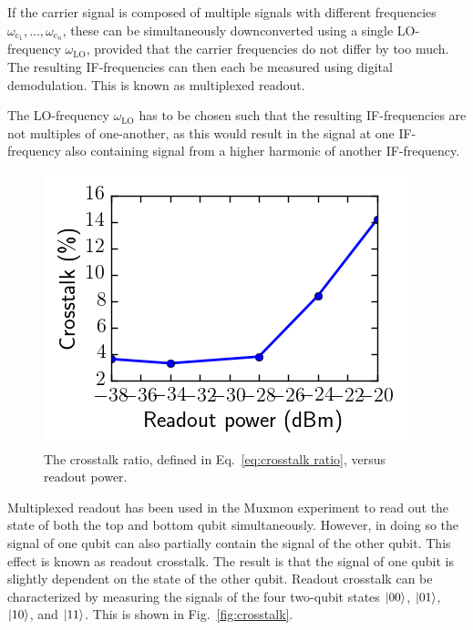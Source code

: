           If the carrier signal is composed of multiple signals with different frequencies $\omega_{\text{c}_1}, ..., \omega_{\text{c}_n}$, these can be simultaneously downconverted using a single LO-frequency $\omega_\text{LO}$, provided that the carrier frequencies do not differ by too much. The resulting IF-frequencies can then each be measured using digital demodulation. This is known as multiplexed readout.

          The LO-frequency $\omega_\text{LO}$ has to be chosen such that the resulting IF-frequencies are not multiples of one-another, as this would result in the signal at one IF-frequency also containing signal from a higher harmonic of another IF-frequency.

          \begin{figure}
            \begin{center}
            \vspace{-30pt}
              \includegraphics[width=\textwidth]{Figures/Calibration routines/crosstalk ratio.png}
            \end{center}
            \vspace{-20 pt}
            \caption{The crosstalk ratio, defined in Eq.~\ref{eq:crosstalk ratio}, versus readout power.}
            \label{fig:crosstalk ratio}
          \end{figure}

          Multiplexed readout has been used in the Muxmon experiment to read out the state of both the top and bottom qubit simultaneously. However, in doing so the signal of one qubit can also partially contain the signal of the other qubit. This effect is known as readout crosstalk. The result is that the signal of one qubit is slightly dependent on the state of the other qubit. Readout crosstalk can be characterized by measuring the signals of the four two-qubit states $\ket{00}$, $\ket{01}$, $\ket{10}$, and $\ket{11}$. This is shown in Fig.~\ref{fig:crosstalk}.

